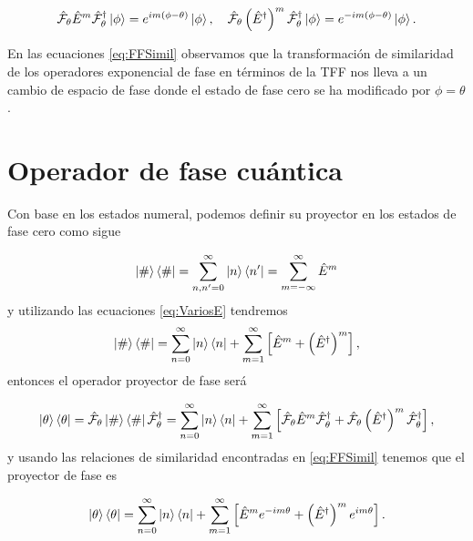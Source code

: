         \begin{equation}\label{eq:FFSimil}
            \hat{\mathcal{F}}_\theta \hat{E}^m \hat{\mathcal{F}}^\dagger_\theta \ket{\phi} = e^{im(\phi-\theta)}\ket{\phi}, \quad \hat{\mathcal{F}}_\theta \left( \hat{E}^\dagger \right)^m \hat{\mathcal{F}}_\theta^\dagger\ket{\phi} = e^{-im(\phi-\theta)}\ket{\phi}.
        \end{equation}

        En las ecuaciones \ref{eq:FFSimil} observamos que la transformación de similaridad de los operadores exponencial de fase en términos de la TFF nos lleva a un cambio de espacio de fase donde el estado de fase cero se ha modificado por $\phi = \theta$.

\section{Operador de fase cuántica}

        Con base en los estados numeral, podemos definir su proyector en los estados de fase cero como sigue

        \begin{equation}
            \ket{\#}\bra{\#} = \sum_{n,n'=0}^\infty \ket{n}\bra{n'} = \sum_{m=-\infty}^\infty \hat{E}^m
        \end{equation}
        y utilizando las ecuaciones \ref{eq:VariosE} tendremos
        \begin{equation}
            \ket{\#}\bra{\#} = \sum_{n=0}^\infty \ket{n}\bra{n} + \sum_{m=1}^\infty \left[ \hat{E}^m + \left( \hat{E}^\dagger \right)^m \right],
        \end{equation}
        entonces el operador proyector de fase será

        \begin{equation}
            \ket{\theta}\bra{\theta} = \hat{\mathcal{F}}_\theta \ket{\#}\bra{\#}\hat{\mathcal{F}}_\theta^\dagger = \sum_{n=0}^\infty \ket{n}\bra{n} + \sum_{m=1}^\infty \left[ \hat{\mathcal{F}}_\theta \hat{E}^m \hat{\mathcal{F}}_\theta^\dagger + \hat{\mathcal{F}}_\theta \left( \hat{E}^\dagger \right)^m \hat{\mathcal{F}}_\theta^\dagger \right],
        \end{equation}
        y usando las relaciones de similaridad encontradas en \ref{eq:FFSimil} tenemos que el proyector de fase es

        \begin{equation}\label{eq:FaseProy}
            \ket{\theta}\bra{\theta} = \sum_{n=0}^\infty\ket{n}\bra{n} + \sum_{m=1}^\infty \left[ \hat{E}^m e^{-im\theta} + \left( \hat{E}^\dagger \right)^me^{im\theta} \right].
        \end{equation}

